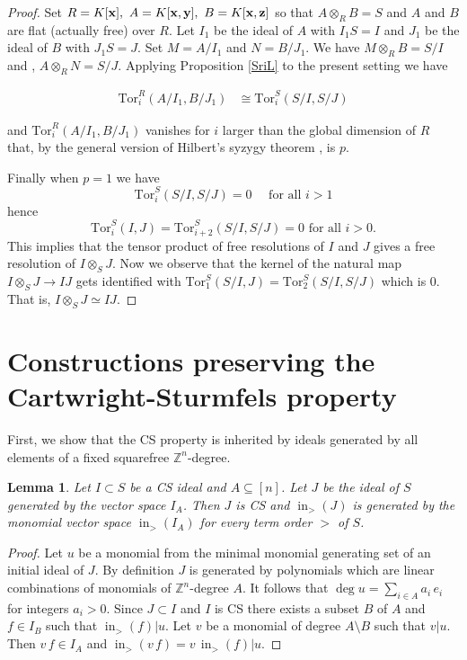 \documentclass{amsart}
\newtheorem{lemma}[theorem]{Lemma}
\theoremstyle{definition}
\numberwithin{equation}{section}
\def\ini{\operatorname{in}}
\def\to{\longrightarrow}
\def\x{\bf{x}}
\def\y{\bf{y}}
\def\z{\bf{z}}
\def\ZZ{\mathbb{Z}}
\begin{document}
\begin{proof}
Set  $R=K[{\x}],\ A=K[{\x,\y}],\ B=K[{\x,\z}]$ so that $A\otimes_R B=S$ and $A$ and $B$ are flat (actually free) over $R$. Let $I_1$ be the ideal of $A$ with $I_1S=I$ and $J_1$ be the ideal of $B$ with $J_1S=J$. Set $M=A/I_1$ and $N=B/J_1$. We have $M\otimes_R B=S/I$ and , $A\otimes_R N=S/J$. Applying Proposition \ref{SriL} to the present setting we have  

\begin{align*}
\mathrm{Tor}^R_i(A/I_1,B/J_1) & \cong
    \mathrm{Tor}^S_i(S/I,S/J)
 \end{align*}

and $\mathrm{Tor}^R_i(A/I_1,B/J_1)$ vanishes for $i$ larger than the global dimension of $R$ that, by the general version of  Hilbert's syzygy theorem \cite[Theorem 8.37]{Rotman}, is $p$.  

Finally when $p=1$ we have 
$$
\mathrm{Tor}^S_i(S/I, S/J) = 0 \quad \text{ for all } i > 1
$$
hence 
$$
\mathrm{Tor}^S_i(I, J)=\mathrm{Tor}^S_{i+2}(S/I, S/J) = 0  \text{ for all } i > 0.$$
This implies that the tensor product of free resolutions of $ I $ and $ J $ gives a free resolution of $ I \otimes_S J$.
 Now we observe that the kernel of the natural map   $ I \otimes_S J \to IJ$ gets identified with 
 $\mathrm{Tor}^S_1(S/I, J)=\mathrm{Tor}^S_2(S/I, S/J)$ which is $0$. 
That is, $I \otimes_S J \simeq IJ$.
\end{proof}


\section{Constructions preserving the Cartwright-Sturmfels property}
\label{section:NewCS}


First, we show that the CS property is inherited by ideals generated by
all elements of a fixed squarefree $\ZZ^n$-degree.

\begin{lemma} \label{easy1} 
Let $I\subset S$ be a CS ideal and $A\subseteq [n]$.  Let $J$ be the ideal of $S$ generated by the vector space $I_A$.  Then $J$ is CS and $\ini_{>}(J)$ is generated by the monomial vector space $\ini_{>}(I_A)$ for every  term order $>$ of $S$. 
\end{lemma}

\begin{proof}
  Let $u$ be a monomial from the minimal monomial 
  generating set of an initial ideal of $J$.  
  By definition $J$ is generated by polynomials which are linear combinations of monomials of
  $\ZZ^n$-degree $A$. It follows that $\deg u=\sum_{i\in A} a_i\,e_i $ for integers $a_i >0$. Since $J\subset I$ and $I$ is CS  
  there exists a subset $B$ of $A$ and $f\in I_B$ such that $\ini_{>}(f) | u$. Let $v$ be a monomial of degree $A\setminus B$
  such that $v|u$.
  Then $v\,f\in I_A$ and $\ini_{>}(v\,f)=v\,\ini_{>}(f) | u$. 
\end{proof} 
\end{document}
